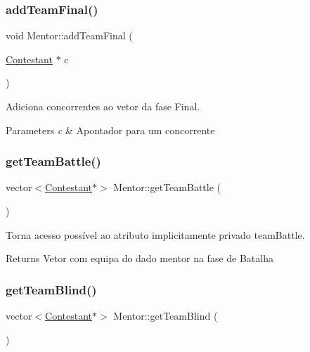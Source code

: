 \subsubsection{\texorpdfstring{add\+Team\+Final()}{addTeamFinal()}}
{\footnotesize\ttfamily void Mentor\+::add\+Team\+Final (\begin{DoxyParamCaption}\item[{\hyperlink{class_contestant}{Contestant} $\ast$}]{c }\end{DoxyParamCaption})}



Adiciona concorrentes ao vetor da fase Final. 


\begin{DoxyParams}{Parameters}
{\em c} & Apontador para um concorrente \\
\hline
\end{DoxyParams}
\hypertarget{class_mentor_a9b549210f82be5527eac9c86bf06505c}{}\label{class_mentor_a9b549210f82be5527eac9c86bf06505c} 
\subsubsection{\texorpdfstring{get\+Team\+Battle()}{getTeamBattle()}}
{\footnotesize\ttfamily vector$<$\hyperlink{class_contestant}{Contestant}$\ast$$>$ Mentor\+::get\+Team\+Battle (\begin{DoxyParamCaption}{ }\end{DoxyParamCaption})\hspace{0.3cm}{\ttfamily [inline]}}



Torna acesso possível ao atributo implicitamente privado team\+Battle. 

\begin{DoxyReturn}{Returns}
Vetor com equipa do dado mentor na fase de Batalha 
\end{DoxyReturn}
\hypertarget{class_mentor_a17141c1586d8f01dab4ad23af7281894}{}\label{class_mentor_a17141c1586d8f01dab4ad23af7281894} 
\subsubsection{\texorpdfstring{get\+Team\+Blind()}{getTeamBlind()}}
{\footnotesize\ttfamily vector$<$\hyperlink{class_contestant}{Contestant}$\ast$$>$ Mentor\+::get\+Team\+Blind (\begin{DoxyParamCaption}{ }\end{DoxyParamCaption})\hspace{0.3cm}{\ttfamily [inline]}}




